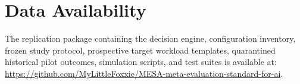 \documentclass[runningheads]{llncs}
\begin{document}
\section*{Data Availability}
The replication package containing the decision engine, configuration inventory, frozen study protocol, prospective target workload templates, quarantined historical pilot outcomes, simulation scripts, and test suites is available at: \url{https://github.com/MyLittleFoxxie/MESA-meta-evaluation-standard-for-ai}.



\end{document}
